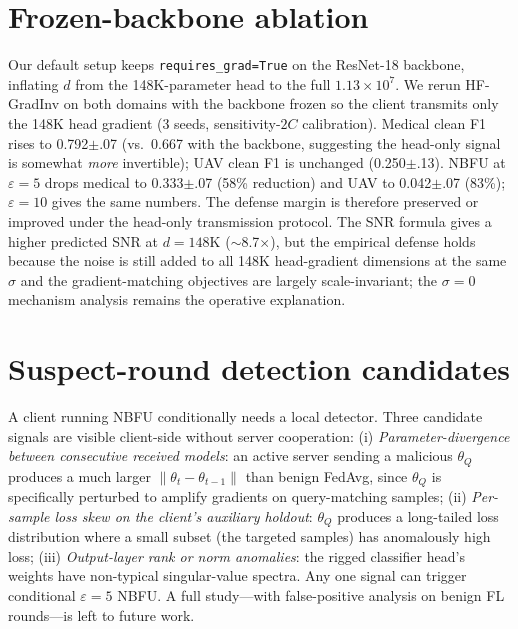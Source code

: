 \documentclass[11pt]{article}
\begin{document}
\section{Frozen-backbone ablation}
\label{app:frozen}
Our default setup keeps \texttt{requires\_grad=True} on the ResNet-18 backbone, inflating $d$ from the 148K-parameter head to the full $1.13{\times}10^{7}$. We rerun HF-GradInv on both domains with the backbone frozen so the client transmits only the 148K head gradient (3 seeds, sensitivity-$2C$ calibration). Medical clean F1 rises to 0.792$\pm$.07 (vs.\ 0.667 with the backbone, suggesting the head-only signal is somewhat \emph{more} invertible); UAV clean F1 is unchanged (0.250$\pm$.13). NBFU at $\varepsilon{=}5$ drops medical to 0.333$\pm$.07 (58\% reduction) and UAV to 0.042$\pm$.07 (83\%); $\varepsilon{=}10$ gives the same numbers. The defense margin is therefore preserved or improved under the head-only transmission protocol. The SNR formula gives a higher predicted SNR at $d{=}148\text{K}$ ($\sim$8.7$\times$), but the empirical defense holds because the noise is still added to all 148K head-gradient dimensions at the same $\sigma$ and the gradient-matching objectives are largely scale-invariant; the $\sigma{=}0$ mechanism analysis remains the operative explanation.

\section{Suspect-round detection candidates}
\label{app:detection}
A client running NBFU conditionally needs a local detector. Three candidate signals are visible client-side without server cooperation: (i) \emph{Parameter-divergence between consecutive received models}: an active server sending a malicious $\theta_Q$ produces a much larger $\|\theta_t - \theta_{t-1}\|$ than benign FedAvg, since $\theta_Q$ is specifically perturbed to amplify gradients on query-matching samples; (ii) \emph{Per-sample loss skew on the client's auxiliary holdout}: $\theta_Q$ produces a long-tailed loss distribution where a small subset (the targeted samples) has anomalously high loss; (iii) \emph{Output-layer rank or norm anomalies}: the rigged classifier head's weights have non-typical singular-value spectra. Any one signal can trigger conditional $\varepsilon{=}5$ NBFU. A full study---with false-positive analysis on benign FL rounds---is left to future work.
\end{document}
